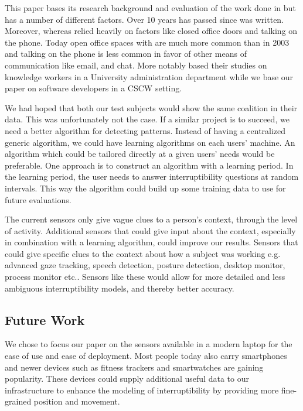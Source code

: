 \documentclass{sigchi}
\begin{document}
This paper bases its research background and evaluation of the work done in \cite{fogarty2005predicting} but has a number of different factors.
Over 10 years has passed since \cite{fogarty2005predicting} was written.
Moreover, whereas \cite{fogarty2005predicting} relied heavily on factors like closed office doors and talking on the phone.
Today open office spaces with are much more common than in 2003 and talking on the phone is less common in favor of other means of communication like email, and chat.
More notably \cite{fogarty2005predicting} based their studies on knowledge workers in a University administration department while we base our paper on software developers in a CSCW setting.

We had hoped that both our test subjects would show the same coalition in their data.
This was unfortunately not the case.
If a similar project is to succeed, we need a better algorithm for detecting patterns.
Instead of having a centralized generic algorithm, we could have learning algorithms on each users' machine.
An algorithm which could be tailored directly at a given users' needs would be preferable.
One approach is to construct an algorithm with a learning period.
In the learning period, the user needs to answer interruptibility questions at random intervals.
This way the algorithm could build up some training data to use for future evaluations.

The current sensors only give vague clues to a person's context, through the level of activity.
Additional sensors that could give input about the context, especially in combination with a learning algorithm, could improve our results.
Sensors that could give specific clues to the context about how a subject was working e.g. advanced gaze tracking, speech detection, posture detection, desktop monitor, process monitor etc..
Sensors like these would allow for more detailed and less ambiguous interruptibility models, and thereby better accuracy.

\subsection{Future Work}
We chose to focus our paper on the sensors available in a modern laptop for the ease of use and ease of deployment.
Most people today also carry smartphones and newer devices such as fitness trackers and smartwatches are gaining popularity.
These devices could supply additional useful data to our infrastructure to enhance the modeling of interruptibility by providing more fine-grained position and movement.
\end{document}

